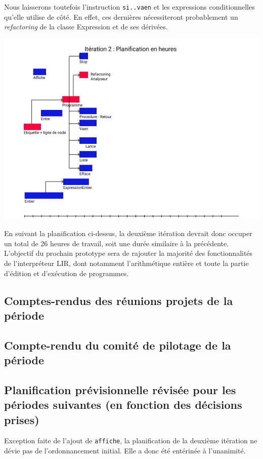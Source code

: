 Nous laisserons toutefois l'instruction \verb|si..vaen| et les expressions
conditionnelles qu'elle utilise de côté. En effet, ces dernières nécessiteront
probablement un \emph{refactoring} de la classe Expression et de ses dérivées.

\includegraphics[scale=0.75]{fichiers/planification/iteration2/iteration2Planif.png}

En suivant la planification ci-dessus, la deuxième itération devrait donc occuper
un total de 26 heures de travail, soit une durée similaire à la précédente.
L'objectif du prochain prototype sera de rajouter la majorité des fonctionnalités
de l'interpréteur LIR, dont notamment l'arithmétique entière et toute la partie
d'édition et d'exécution de programmes.

\subsection{Comptes-rendus des réunions projets de la période}

\subsection{Compte-rendu du comité de pilotage de la période}

\subsection{Planification prévisionnelle révisée pour les périodes suivantes (en fonction des décisions prises)}
Exception faite de l'ajout de \verb|affiche|, la planification de la
deuxième itération ne dévie pas de l'ordonnancement initial. Elle a donc
été entérinée à l'unanimité.


